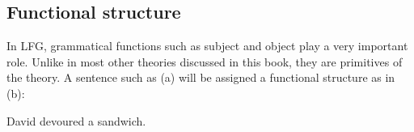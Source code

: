 \subsection{Functional structure}

In LFG, grammatical functions such as subject and object play a very important role. Unlike in most other theories discussed in this book, they are primitives
of the theory. A sentence such as (a) will be assigned a functional structure as in (b):


\eal
\ex David devoured a sandwich.
\ex {}
\zl


